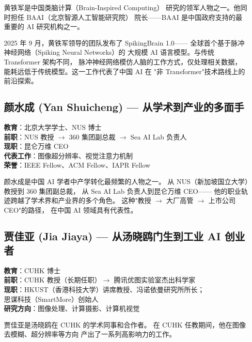 黄铁军是中国类脑计算（Brain-Inspired Computing）
研究的领军人物之一。他同时担任 BAAI（北京智源人工智能研究院）
院长——BAAI 是中国政府支持的最重要的 AI 研究机构之一。

2025 年 9 月，黄铁军领导的团队发布了 SpikingBrain 1.0——
全球首个基于脉冲神经网络（Spiking Neural Networks）的
大规模 AI 语言模型。与传统 Transformer 架构不同，
脉冲神经网络模仿人脑的工作方式，仅处理相关数据，
能耗远低于传统模型。这一工作代表了中国 AI 在
"非 Transformer"技术路线上的前沿探索。


\subsection{颜水成 (Yan Shuicheng) — 从学术到产业的多面手}

\begin{keybox}
\textbf{教育}：北京大学学士、NUS 博士 \\
\textbf{前职}：NUS 教授 $\to$ 360 集团副总裁 $\to$ Sea AI Lab 负责人 \\
\textbf{现职}：昆仑万维 CEO \\
\textbf{代表工作}：图像超分辨率、视觉注意力机制 \\
\textbf{荣誉}：IEEE Fellow、ACM Fellow、IAPR Fellow
\end{keybox}

颜水成是中国 AI 学者中产学转化最频繁的人物之一。
从 NUS（新加坡国立大学）教授到 360 集团副总裁，
从 Sea AI Lab 负责人到昆仑万维 CEO——
他的职业轨迹跨越了学术界和产业界的多个角色。
这种"教授 $\to$ 大厂高管 $\to$ 上市公司 CEO"的路径，
在中国 AI 领域具有代表性。


\subsection{贾佳亚 (Jia Jiaya) — 从汤晓鸥门生到工业 AI 创业者}

\begin{keybox}
\textbf{教育}：CUHK 博士 \\
\textbf{前职}：CUHK 教授（长期任职）$\to$ 腾讯优图实验室杰出科学家 \\
\textbf{现职}：HKUST（香港科技大学）讲席教授、冯诺依曼研究所所长；\\
\quad 思谋科技（SmartMore）创始人 \\
\textbf{研究方向}：图像处理、计算摄影、计算机视觉
\end{keybox}

贾佳亚是汤晓鸥在 CUHK 的学术同事和合作者。
在 CUHK 任教期间，他在图像去模糊、超分辨率等方向
产出了一系列高影响力的工作。

